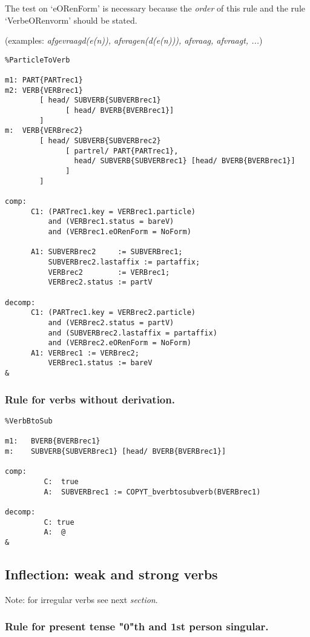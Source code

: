 The test on `eORenForm' is necessary because the {\em order} of this rule and 
the rule `VerbeORenvorm' should be stated.

(examples: {\em afgevraagd(e(n)), afvragen(d(e(n))), afvraag, afvraagt, ...})
\begin{verbatim}
%ParticleToVerb

m1: PART{PARTrec1}
m2: VERB{VERBrec1} 
        [ head/ SUBVERB{SUBVERBrec1} 
              [ head/ BVERB{BVERBrec1}] 
        ]
m:  VERB{VERBrec2} 
        [ head/ SUBVERB{SUBVERBrec2} 
              [ partrel/ PART{PARTrec1},
                head/ SUBVERB{SUBVERBrec1} [head/ BVERB{BVERBrec1}] 
              ]
        ]

comp:
      C1: (PARTrec1.key = VERBrec1.particle)
          and (VERBrec1.status = bareV)
          and (VERBrec1.eORenForm = NoForm)
          
      A1: SUBVERBrec2     := SUBVERBrec1;
          SUBVERBrec2.lastaffix := partaffix;
          VERBrec2        := VERBrec1;
          VERBrec2.status := partV

decomp: 
      C1: (PARTrec1.key = VERBrec2.particle)
          and (VERBrec2.status = partV)
          and (SUBVERBrec2.lastaffix = partaffix)
          and (VERBrec2.eORenForm = NoForm)
      A1: VERBrec1 := VERBrec2;
          VERBrec1.status := bareV
&
\end{verbatim}
\newpage
\subsubsection{Rule for verbs without derivation.}
\begin{verbatim}
%VerbBtoSub

m1:   BVERB{BVERBrec1}
m:    SUBVERB{SUBVERBrec1} [head/ BVERB{BVERBrec1}]

comp:        
         C:  true
         A:  SUBVERBrec1 := COPYT_bverbtosubverb(BVERBrec1)

decomp:      
         C: true
         A:  @
&
\end{verbatim}
\newpage
\subsection{Inflection: weak and strong verbs}

Note: for irregular verbs see next {\em section}.

\subsubsection{Rule for present tense "0"th and 1st person singular.}

